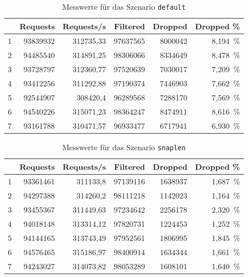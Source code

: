 \begin{table}[H]
  \centering
  \bgroup
  \def\arraystretch{1.2}
  \begin{tabular}{crrrrr}
      & \textbf{Requests} & \textbf{Requests/s} & \textbf{Filtered} & \textbf{Dropped} & \textbf{Dropped \%} \\\hline\hline
      1 & 93839932 & 312735,33 & 97637565 & 8000042 & 8,194~\%\\\hline
      2 & 94485540 & 314891,25 & 98306066 & 8334649 & 8,478~\%\\\hline
      3 & 93728797 & 312360,77 & 97520639 & 7030017 & 7,209~\%\\\hline
      4 & 93412256 & 311292,88 & 97190374 & 7446903 & 7,662~\%\\\hline
      5 & 92544907 & 308420,4 & 96289568 & 7288170 & 7,569~\%\\\hline
      6 & 94540226 & 315071,23 & 98364247 & 8474911 & 8,616~\%\\\hline
      7 & 93161788 & 310471,57 & 96933477 & 6717941 & 6,930~\%\\\hline
  \end{tabular}
  \egroup
  \caption{Messwerte für das Szenario \texttt{default}}\label{tab:messwerte-default}
\end{table}

\begin{table}[H]
  \centering
  \bgroup
  \def\arraystretch{1.2}
  \begin{tabular}{crrrrr}
      & \textbf{Requests} & \textbf{Requests/s} & \textbf{Filtered} & \textbf{Dropped} & \textbf{Dropped \%} \\\hline\hline
      1 & 93361461 & 311133,8 & 97139116 & 1638937 & 1,687~\%\\\hline
      2 & 94297388 & 314260,2 & 98111218 & 1142023 & 1,164~\%\\\hline
      3 & 93455367 & 311449,63 & 97234642 & 2256178 & 2,320~\%\\\hline
      4 & 94018148 & 313314,12 & 97820731 & 1224453 & 1,252~\%\\\hline
      5 & 94144165 & 313743,49 & 97952561 & 1806995 & 1,845~\%\\\hline
      6 & 94576465 & 315186,97 & 98400914 & 1634344 & 1,661~\%\\\hline
      7 & 94243027 & 314073,82 & 98053289 & 1608101 & 1,640~\%\\\hline
  \end{tabular}
  \egroup
  \caption{Messwerte für das Szenario \texttt{snaplen}}\label{tab:messwerte-snaplen}
\end{table}

